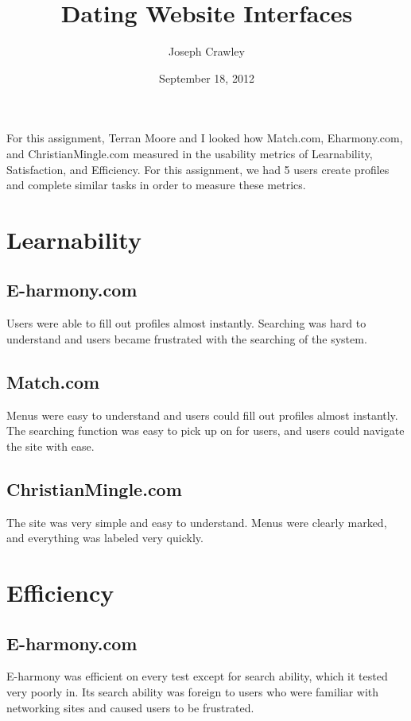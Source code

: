 \documentclass{article}
\title{Dating Website Interfaces}
\author{Joseph Crawley}
\date{September 18, 2012}
\begin{document}
\maketitle

\abstract{}
For this assignment, Terran Moore and I looked how Match.com, Eharmony.com, and ChristianMingle.com measured in the usability metrics of Learnability, Satisfaction, and Efficiency. For this assignment, we had 5 users create profiles and complete similar tasks in order to measure these metrics.  

\pagebreak
\tableofcontents





\pagebreak

%
%
\section{Learnability}
\label{Learnability}

\subsection{E-harmony.com}
Users were able to fill out profiles almost instantly. Searching was hard to understand and users became frustrated with the searching of the system.

\subsection{Match.com}
Menus were easy to understand and users could fill out profiles almost instantly. The searching function was easy to pick up on for users, and users could navigate the site with ease.

\subsection{ChristianMingle.com}
The site was very simple and easy to understand. Menus were clearly marked, and everything was labeled very quickly.


\section{Efficiency}
\subsection{E-harmony.com}
E-harmony was efficient on every test except for search ability, which it tested very poorly in. Its search ability was foreign to users who were familiar with networking sites and caused users to be frustrated.
\end{document}
